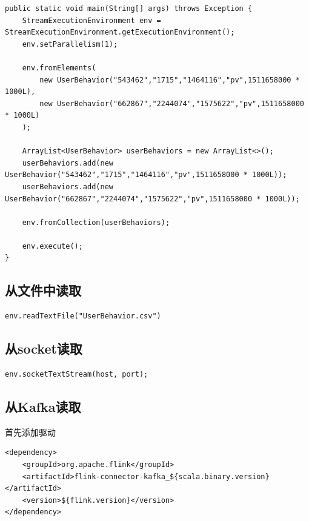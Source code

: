 \documentclass[cn,11pt,chinese]{elegantbook}
\begin{document}
\begin{verbatim}
public static void main(String[] args) throws Exception {
    StreamExecutionEnvironment env = StreamExecutionEnvironment.getExecutionEnvironment();
    env.setParallelism(1);
    
    env.fromElements(
        new UserBehavior("543462","1715","1464116","pv",1511658000 * 1000L),
        new UserBehavior("662867","2244074","1575622","pv",1511658000 * 1000L)
    );
    
    ArrayList<UserBehavior> userBehaviors = new ArrayList<>();
    userBehaviors.add(new UserBehavior("543462","1715","1464116","pv",1511658000 * 1000L));
    userBehaviors.add(new UserBehavior("662867","2244074","1575622","pv",1511658000 * 1000L));
    
    env.fromCollection(userBehaviors);
    
    env.execute();
}
\end{verbatim}

\subsection{从文件中读取}

\begin{verbatim}
env.readTextFile("UserBehavior.csv")
\end{verbatim}

\subsection{从socket读取}

\begin{verbatim}
env.socketTextStream(host, port);
\end{verbatim}

\subsection{从Kafka读取}

首先添加驱动

\begin{verbatim}
<dependency>
    <groupId>org.apache.flink</groupId>
    <artifactId>flink-connector-kafka_${scala.binary.version}</artifactId>
    <version>${flink.version}</version>
</dependency>
\end{verbatim}
\end{document}
